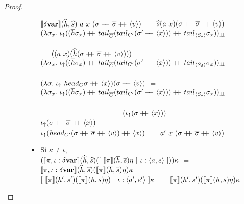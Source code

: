 \begin{proof}
\begin{itemize}
\begin{itemize}
\begin{itemize}
$\llbracket \delta \textbf{var} \rrbracket(\widehat{h},\widehat{s}) \ a \ x \ (\sigma +\kern-1.3ex+\kern0.8ex \overline{\sigma} +\kern-1.3ex+\kern0.8ex \langle v \rangle)$ $=$
$\widehat{s} (a \ x) (\sigma +\kern-1.3ex+\kern0.8ex \overline{\sigma} +\kern-1.3ex+\kern0.8ex \langle v \rangle)$ $=$\\
$(\lambda \sigma_{x} . \  \iotabot (
				(\hover \sigma_{x}) \concat 
				tail_{\Cover}(tail_{C'}(\sigma' \concat \lrangles{x})) \concat
				tail_{\lrangles{S_\delta}}\sigma_{x}))_{\dbot}$\\
\indent \ \ \ \ \ \ \ \ \ \ \ \ \ \ \ \ \ \ \ \ \ \ \ \ \ \ \ \ \ \ \ \ \ \ \ \ \ \ \ \ \ \ \ \
 \ \ \ \ \ \ \ \ \ \ \ \ \ \ \ \ \ \ \ \
$((a \ x)(\widehat{h} (\sigma +\kern-1.3ex+\kern0.8ex \overline{\sigma} +\kern-1.3ex+\kern0.8ex \langle v \rangle)))$ $=$\\
$(\lambda \sigma_{x} . \  \iotabot (
				(\hover \sigma_{x}) \concat 
				tail_{\Cover}(tail_{C'}(\sigma' \concat \lrangles{x})) \concat
				tail_{\lrangles{S_\delta}}\sigma_{x}))_{\dbot}$\\
\indent \ \ \ \ \ \ \ \ \ \ \ \ \ \ \ \ \ \ \ \ \ \ \ \ \ \ \ \ \ \ \ \ \ \ \ \ \ \ \ \ \ \ \ \
 \ \ \ \ \ \ \ \ \ 
$(\lambda \sigma. \ \iotabot \ 
		head_{C}\sigma \concat \lrangles{x})(\sigma \concat \lrangles{v})$ $=$\\
$(\lambda \sigma_{x} . \ \iotabot (
				(\hover \sigma_{x}) \concat 
				tail_{\Cover}(tail_{C'}(\sigma' \concat \lrangles{x})) \concat
				tail_{\lrangles{S_\delta}}\sigma_{x}))_{\dbot}$\\
\indent \ \ \ \ \ \ \ \ \ \ \ \ \ \ \ \ \ \ \ \ \ \ \ \ \ \ \ \ \ \ \ \ \ \ \ \ \ \ \ \ \ \ \ \
 \ \ \ \ \ \ \ \ \ \ \ \ \ \ \ \ \ \ \ \ \ \ \ \ \ \ \ \ \ \ \ \ \ \ \ \ \ \ \ \
$(\iota_{\uparrow} (\sigma +\kern-1.3ex+\kern0.8ex \langle x \rangle))$ $=$\\
$\iota_{\uparrow} (\sigma +\kern-1.3ex+\kern0.8ex \overline{\sigma} +\kern-1.3ex+\kern0.8ex \langle x \rangle)$ $=$\\
$\iota_{\uparrow} (head_{C'}(\sigma +\kern-1.3ex+\kern0.8ex \overline{\sigma} +\kern-1.3ex+\kern0.8ex \langle v \rangle) +\kern-1.3ex+\kern0.8ex \langle x \rangle)$ $=$
$a' \ x \ (\sigma +\kern-1.3ex+\kern0.8ex \overline{\sigma} +\kern-1.3ex+\kern0.8ex \langle v \rangle)$\\

\item S\'i $\kappa \neq \iota$,\\

$(\semBrcks{\pi,\iota:\deltavar}(\hhat,\shat)
([ \ \semBrcks{\pi}(\hover,\sover)\eta \ | \ \iota:\lrangles{a,e} \ ]))\kappa$ $=$
$\llbracket \pi,\iota:\delta \textbf{var} \rrbracket(\widehat{h},\widehat{s})(\llbracket \pi \rrbracket(\overline{h},\overline{s})\eta) \kappa$\\

$[ \ \semBrcks{\pi}(h',s')(\semBrcks{\pi}(h,s)\eta) \ | \ \iota:\lrangles{a',e'} \ ] \kappa$ $=$
$\llbracket \pi \rrbracket(h',s')(\llbracket \pi \rrbracket(h,s)\eta)\kappa$\\


\end{itemize}
\end{itemize}
\end{itemize}
\end{proof}
